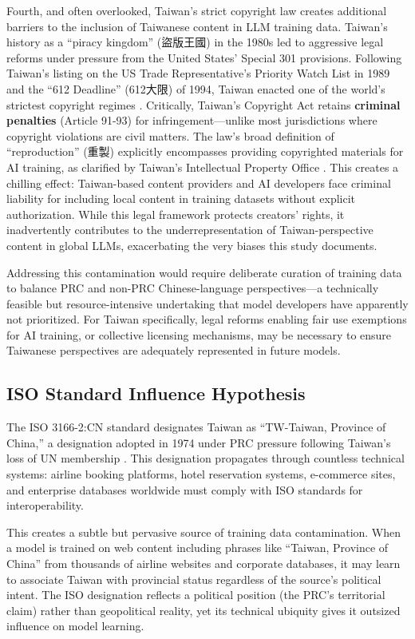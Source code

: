 \documentclass[11pt,a4paper]{article}
\begin{document}
Fourth, and often overlooked, Taiwan's strict copyright law creates additional barriers to the inclusion of Taiwanese content in LLM training data. Taiwan's history as a ``piracy kingdom'' (盜版王國) in the 1980s led to aggressive legal reforms under pressure from the United States' Special 301 provisions. Following Taiwan's listing on the US Trade Representative's Priority Watch List in 1989 and the ``612 Deadline'' (612大限) of 1994, Taiwan enacted one of the world's strictest copyright regimes \citep{taiwan301history}. Critically, Taiwan's Copyright Act retains \textbf{criminal penalties} (Article 91-93) for infringement---unlike most jurisdictions where copyright violations are civil matters. The law's broad definition of ``reproduction'' (重製) explicitly encompasses providing copyrighted materials for AI training, as clarified by Taiwan's Intellectual Property Office \citep{tipo2024ai}. This creates a chilling effect: Taiwan-based content providers and AI developers face criminal liability for including local content in training datasets without explicit authorization. While this legal framework protects creators' rights, it inadvertently contributes to the underrepresentation of Taiwan-perspective content in global LLMs, exacerbating the very biases this study documents.

Addressing this contamination would require deliberate curation of training data to balance PRC and non-PRC Chinese-language perspectives---a technically feasible but resource-intensive undertaking that model developers have apparently not prioritized. For Taiwan specifically, legal reforms enabling fair use exemptions for AI training, or collective licensing mechanisms, may be necessary to ensure Taiwanese perspectives are adequately represented in future models.

\subsection{ISO Standard Influence Hypothesis}

The ISO 3166-2:CN standard designates Taiwan as ``TW-Taiwan, Province of China,'' a designation adopted in 1974 under PRC pressure following Taiwan's loss of UN membership \citep{iso3166taiwan}. This designation propagates through countless technical systems: airline booking platforms, hotel reservation systems, e-commerce sites, and enterprise databases worldwide must comply with ISO standards for interoperability.

This creates a subtle but pervasive source of training data contamination. When a model is trained on web content including phrases like ``Taiwan, Province of China'' from thousands of airline websites and corporate databases, it may learn to associate Taiwan with provincial status regardless of the source's political intent. The ISO designation reflects a political position (the PRC's territorial claim) rather than geopolitical reality, yet its technical ubiquity gives it outsized influence on model learning.
\end{document}
